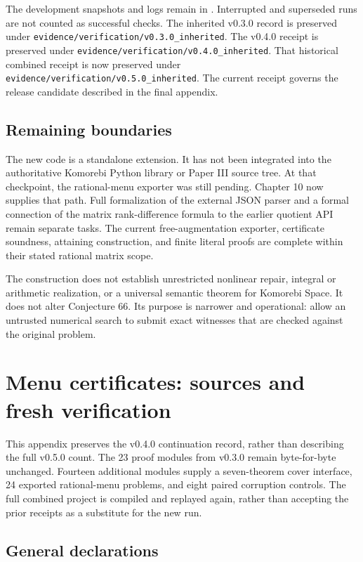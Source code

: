 \documentclass[11pt,letterpaper,oneside,openany]{book}
\theoremstyle{quiet}
\newcommand{\code}[1]{\texttt{\detokenize{#1}}}
\begin{document}
The development snapshots and logs remain in \code{evidence/development}. Interrupted and superseded runs are not counted as successful checks. The inherited v0.3.0 record is preserved under \nolinkurl{evidence/verification/v0.3.0_inherited}. The v0.4.0 receipt is preserved under \nolinkurl{evidence/verification/v0.4.0_inherited}. That historical combined receipt is now preserved under \nolinkurl{evidence/verification/v0.5.0_inherited}. The current receipt governs the release candidate described in the final appendix.

\section{Remaining boundaries}

The new code is a standalone extension. It has not been integrated into the authoritative Komorebi Python library or Paper III source tree. At that checkpoint, the rational-menu exporter was still pending. Chapter 10 now supplies that path. Full formalization of the external JSON parser and a formal connection of the matrix rank-difference formula to the earlier quotient API remain separate tasks. The current free-augmentation exporter, certificate soundness, attaining construction, and finite literal proofs are complete within their stated rational matrix scope.

The construction does not establish unrestricted nonlinear repair, integral or arithmetic realization, or a universal semantic theorem for Komorebi Space. It does not alter Conjecture 66. Its purpose is narrower and operational: allow an untrusted numerical search to submit exact witnesses that are checked against the original problem.

\chapter{Menu certificates: sources and fresh verification}
\label{app:menu-verification}

This appendix preserves the v0.4.0 continuation record, rather than describing the full v0.5.0 count. The 23 proof modules from v0.3.0 remain byte-for-byte unchanged. Fourteen additional modules supply a seven-theorem cover interface, 24 exported rational-menu problems, and eight paired corruption controls. The full combined project is compiled and replayed again, rather than accepting the prior receipts as a substitute for the new run.

\section{General declarations}
\end{document}
